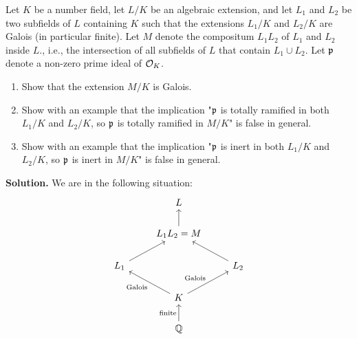 \documentclass[a4paper,11pt]{article}
\begin{document}
Let $K$ be a number field, let $L/K$ be an algebraic extension, and let $L_1$ and $L_2$
be two subfields of $L$ containing $K$ such that the extensions 
$L_1/K$ and $L_2/K$ are Galois (in particular finite). Let $M$ denote the 
compositum $L_1 L_2$ of $L_1$ and $L_2$ inside $L$., i.e., the intersection of all 
subfields of $L$ that contain $L_1 \cup L_2$. Let $\mathfrak{p}$ denote a non-zero prime
ideal of $\mathcal{O}_K$.
\begin{enumerate}
    \item Show that the extension $M/K$ is Galois.
    \item Show with an example that the implication "$\mathfrak{p}$ is totally ramified in 
        both $L_1/K$ and $L_2/K$, so $\mathfrak{p}$ is totally ramified in $M/K$" is false in general.
    \item Show with an example that the implication "$\mathfrak{p}$ is inert in both $L_1/K$ and
        $L_2/K$, so $\mathfrak{p}$ is inert in $M/K$" is false in general.
\end{enumerate}
\textbf{Solution.}
We are in the following situation:
\[\begin{tikzcd}[ampersand replacement=\&]
	\& L \\
	\& {L_1L_2=M} \\
	{L_1} \&\& {L_2} \\
	\& K \\
	\& \Q
	\arrow["{\text{finite}}", from=5-2, to=4-2]
	\arrow[from=3-1, to=2-2]
	\arrow[from=3-3, to=2-2]
    \arrow["\text{Galois}", from=4-2, to=3-3]
    \arrow["\text{Galois}", from=4-2, to=3-1]
	\arrow[from=2-2, to=1-2]
\end{tikzcd}\]
\end{document}
